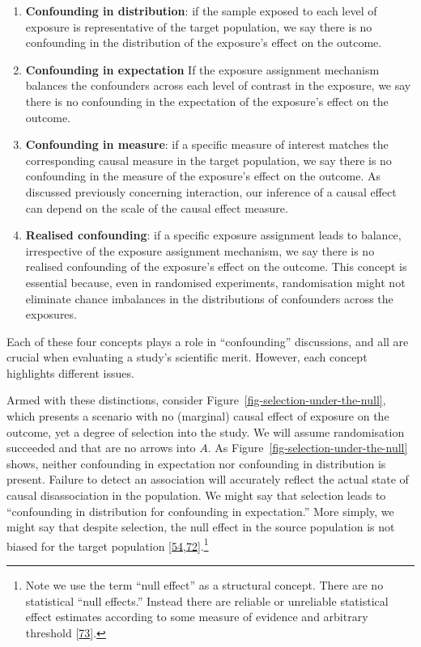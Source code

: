 \documentclass[
  singlecolumn]{article}
\begin{document}
\begin{enumerate}
\def\labelenumi{\arabic{enumi}.}
\item
  \textbf{Confounding in distribution}: if the sample exposed to each
  level of exposure is representative of the target population, we say
  there is no confounding in the distribution of the exposure's effect
  on the outcome.
\item
  \textbf{Confounding in expectation} If the exposure assignment
  mechanism balances the confounders across each level of contrast in
  the exposure, we say there is no confounding in the expectation of the
  exposure's effect on the outcome.
\item
  \textbf{Confounding in measure}: if a specific measure of interest
  matches the corresponding causal measure in the target population, we
  say there is no confounding in the measure of the exposure's effect on
  the outcome. As discussed previously concerning interaction, our
  inference of a causal effect can depend on the scale of the causal
  effect measure.
\item
  \textbf{Realised confounding}: if a specific exposure assignment leads
  to balance, irrespective of the exposure assignment mechanism, we say
  there is no realised confounding of the exposure's effect on the
  outcome. This concept is essential because, even in randomised
  experiments, randomisation might not eliminate chance imbalances in
  the distributions of confounders across the exposures.
\end{enumerate}

Each of these four concepts plays a role in ``confounding'' discussions,
and all are crucial when evaluating a study's scientific merit. However,
each concept highlights different issues.

Armed with these distinctions, consider
Figure~\ref{fig-selection-under-the-null}, which presents a scenario
with no (marginal) causal effect of exposure on the outcome, yet a
degree of selection into the study. We will assume randomisation
succeeded and that are no arrows into \(A\). As
Figure~\ref{fig-selection-under-the-null} shows, neither confounding in
expectation nor confounding in distribution is present. Failure to
detect an association will accurately reflect the actual state of causal
disassociation in the population. We might say that selection leads to
``confounding in distribution for confounding in expectation.'' More
simply, we might say that despite selection, the null effect in the
source population is not biased for the target population
{[}\protect\hyperlink{ref-hernuxe1n2004}{54},\protect\hyperlink{ref-greenland1977}{72}{]}.\footnote{Note
  we use the term ``null effect'' as a structural concept. There are no
  statistical ``null effects.'' Instead there are reliable or unreliable
  statistical effect estimates according to some measure of evidence and
  arbitrary threshold {[}\protect\hyperlink{ref-bulbulia2021}{73}{]}.}
\end{document}
